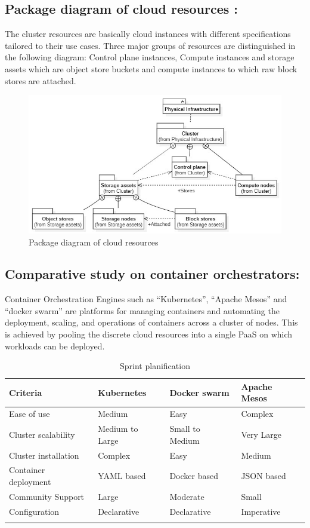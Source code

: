 \subsection{Package diagram of cloud resources :}

The cluster resources are basically cloud instances with different specifications tailored to their use cases. Three major groups of resources are distinguished in the following diagram: Control plane instances, Compute instances and storage assets which are object store buckets and compute instances to which raw block stores are attached. 

\begin{figure}[H]\centering
\includegraphics[width=1.0\textwidth,angle=00]{assets/f11.jpg}
\caption{Package diagram of cloud resources }
\label{fig:Package diagram of cloud resources }
\end{figure}

\subsection{Comparative study on container orchestrators: }

Container Orchestration Engines such as “Kubernetes”, “Apache Mesos” and “docker swarm” are platforms for managing containers and automating the deployment, scaling, and operations of containers across a cluster of nodes. This is achieved by pooling the discrete cloud resources into a single PaaS on which workloads can be deployed. 

\begin{longtable}[H]{|m{3.5cm}|m{3.5cm}|m{3.5cm}|m{3.5cm}|}
\hline
Criteria & Kubernetes & Docker swarm & Apache Mesos  \\
\hline
Ease of use & Medium & Easy & Complex  \\
\hline
Cluster scalability & Medium to Large & Small to Medium & Very Large  \\
\hline
Cluster installation & Complex & Easy & Medium  \\
\hline
Container deployment & YAML based  & Docker based & JSON based \\
\hline
Community Support  & Large  & Moderate  & Small \\
\hline
Configuration & Declarative  & Declarative & Imperative \\
\hline
\caption{Sprint planification}
\end{longtable}

